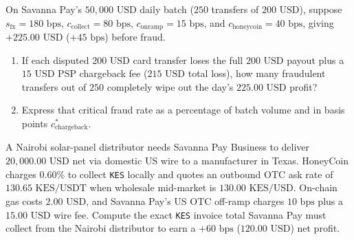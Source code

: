 \begin{exercise}
On Savanna Pay's $50{,}000\text{ USD}$ daily batch ($250$ transfers of $200\text{ USD}$), suppose $s_{\text{fx}} = 180\text{ bps}$, $c_{\text{collect}} = 80\text{ bps}$, $c_{\text{onramp}} = 15\text{ bps}$, and $c_{\text{honeycoin}} = 40\text{ bps}$, giving $+225.00\text{ USD}$ ($+45\text{ bps}$) before fraud.
\begin{enumerate}
  \item If each disputed $200\text{ USD}$ card transfer loses the full $200\text{ USD}$ payout plus a $15\text{ USD}$ PSP chargeback fee ($215\text{ USD}$ total loss), how many fraudulent transfers out of $250$ completely wipe out the day's $225.00\text{ USD}$ profit?
  \item Express that critical fraud rate as a percentage of batch volume and in basis points $c_{\text{chargeback}}^*$.
\end{enumerate}
\end{exercise}

\begin{exercise}
A Nairobi solar-panel distributor needs Savanna Pay Business to deliver $20{,}000.00\text{ USD}$ net via domestic US wire to a manufacturer in Texas. HoneyCoin charges $0.60\%$ to collect \texttt{KES} locally and quotes an outbound OTC ask rate of $130.65\text{ KES/USDT}$ when wholesale mid-market is $130.00\text{ KES/USD}$. On-chain gas costs $2.00\text{ USD}$, and Savanna Pay's US OTC off-ramp charges $10\text{ bps}$ plus a $15.00\text{ USD}$ wire fee. Compute the exact \texttt{KES} invoice total Savanna Pay must collect from the Nairobi distributor to earn a $+60\text{ bps}$ ($120.00\text{ USD}$) net profit.
\end{exercise}
